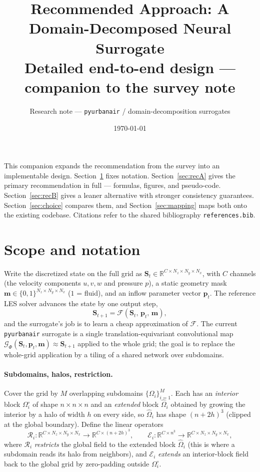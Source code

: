 \documentclass[11pt]{article}
\title{\vspace{-1.2cm}\textbf{Recommended Approach: A Domain-Decomposed Neural Surrogate}\\[2pt]
\large Detailed end-to-end design --- companion to the survey note}
\author{Research note --- \texttt{pyurbanair} / domain-decomposition surrogates}
\date{\today}
\newcommand{\R}{\mathbb{R}}
\newcommand{\Rop}{\mathcal{R}}
\newcommand{\Eop}{\mathcal{E}}
\newcommand{\Gfine}{\mathcal{G}_{\Phi}}
\newcommand{\F}{\mathcal{F}}
\begin{document}
\maketitle
\vspace{-0.5cm}

\noindent
This companion expands the recommendation from the survey into an implementable
design. Section~\ref{sec:notation} fixes notation. Section~\ref{sec:recA} gives
the primary recommendation in full --- formulas, figures, and pseudo-code.
Section~\ref{sec:recB} gives a leaner alternative with stronger consistency
guarantees. Section~\ref{sec:choice} compares them, and
Section~\ref{sec:mapping} maps both onto the existing codebase. Citations refer
to the shared bibliography \texttt{references.bib}.

\section{Scope and notation}\label{sec:notation}

Write the discretized state on the full grid as
$\bm S_t \in \R^{C\times N_z\times N_y\times N_x}$, with $C$ channels (the
velocity components $u,v,w$ and pressure $p$), a static geometry mask
$\bm m \in \{0,1\}^{N_z\times N_y\times N_x}$ ($1$ = fluid), and an inflow
parameter vector $\bm p_t$. The reference LES solver advances the state by one
output step,
\begin{equation}
\bm S_{t+1} = \F(\bm S_t,\, \bm p_t,\, \bm m),
\label{eq:truth}
\end{equation}
and the surrogate's job is to learn a cheap approximation of $\F$. The current
\texttt{pyurbanair} surrogate is a single translation-equivariant convolutional
map $\Gfine(\bm S_t, \bm p_t, \bm m)\approx \bm S_{t+1}$ applied to the whole
grid; the goal is to replace the whole-grid application by a tiling of a shared
network over subdomains.

\paragraph{Subdomains, halos, restriction.}
Cover the grid by $M$ overlapping subdomains $\{\Omega_i\}_{i=1}^M$. Each has an
\emph{interior} block $\Omega_i^\circ$ of shape $n\times n\times n$ and an
\emph{extended} block $\hat\Omega_i$ obtained by growing the interior by a halo
of width $h$ on every side, so $\hat\Omega_i$ has shape $(n+2h)^3$ (clipped at
the global boundary). Define the linear operators
\begin{equation}
\Rop_i : \R^{C\times N_z\times N_y\times N_x} \to \R^{C\times(n+2h)^3},
\qquad
\Eop_i : \R^{C\times n^3} \to \R^{C\times N_z\times N_y\times N_x},
\end{equation}
where $\Rop_i$ \emph{restricts} the global field to the extended block
$\hat\Omega_i$ (this is where a subdomain reads its halo from neighbors), and
$\Eop_i$ \emph{extends} an interior-block field back to the global grid by
zero-padding outside $\Omega_i^\circ$.
\end{document}

